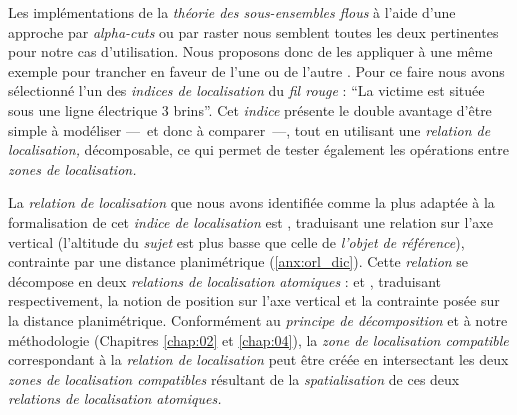 Les implémentations de la \emph{théorie des sous-ensembles flous} à
l'aide d'une approche par \emph{alpha-cuts} ou par raster nous
semblent toutes les deux pertinentes pour notre cas
d'utilisation. Nous proposons donc de les appliquer à une même exemple
pour trancher en faveur de l'une ou de l'autre
\autocite{Bunel2019a}. Pour ce faire nous avons sélectionné l'un des
\emph{indices de localisation} du \emph{fil rouge} : \enquote{La
  victime est située sous une ligne électrique 3 brins}. Cet
\emph{indice} présente le double avantage d'être simple à modéliser
---~et donc à comparer~---, tout en utilisant une \emph{relation de
  localisation,} décomposable, ce qui permet de tester également les
opérations entre \emph{zones de localisation.}

La \emph{relation de localisation} que nous avons identifiée comme la
plus adaptée à la formalisation de cet \emph{indice de localisation}
est , traduisant une relation sur l'axe
vertical (l'altitude du \emph{sujet} est plus basse que celle de
\emph{l'objet de référence}), contrainte par une distance
planimétrique (\autoref{anx:orl_dic}). Cette \emph{relation} se
décompose en deux \emph{relations de localisation atomiques} :
 et
,
traduisant respectivement, la notion de position sur l'axe vertical et
la contrainte posée sur la distance planimétrique. Conformément au
\emph{principe de décomposition} et à notre méthodologie (Chapitres
\ref{chap:02} et \ref{chap:04}), la \emph{zone de localisation
  compatible} correspondant à la \emph{relation de localisation}
 peut être créée en intersectant les
deux \emph{zones de localisation compatibles} résultant de la
\emph{spatialisation} de ces deux \emph{relations de localisation
  atomiques.}

